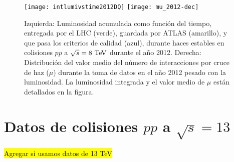 




\begin{figure}[!htbp]
  \centering

  \texttt{[image: intlumivstime2012DQ]}
  \texttt{[image: mu\_2012-dec]}

  \caption{Izquierda: Luminosidad acumulada como función del tiempo, entregada por el LHC (verde),
    guardada por ATLAS (amarillo), y que pasa los criterios de calidad (azul),
    durante haces estables en colisiones $pp$ a $\sqrt{s}=8\tev$ durante el a\~no 2012\cite{lumiplots}.
    Derecha: Distribución del valor medio del número de interacciones por cruce
    de haz ($\mu$) durante la toma de datos en el a\~no 2012 pesado con la luminosidad.
    La luminosidad integrada y el valor medio de $\mu$ están detallados en la figura.
  }
  \label{fig:lumi}

\end{figure}

\section{Datos de colisiones $pp$ a $\sqrt{s} = 13$ \tev}

\hl{Agregar si usamos datos de 13 TeV}
